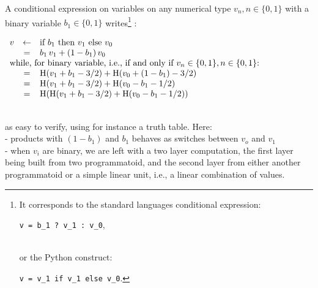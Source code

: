 \documentclass[a4]{article} \usepackage[left=2cm,right=3cm,top=1cm,bottom=2cm]{geometry}
\newcommand{\eqline}[1]{~\vspace{0.1cm}\\\centerline{$#1$}\vspace{0.1cm}\\}
\begin{document}
A conditional expression on variables on any numerical type $v_n, n \in \{0, 1\}$  with a binary variable $b_1 \in \{0, 1\}$ writes\footnote{It corresponds to the standard languages conditional expression: \\\centerline{{\tt v = b\_1 ? v\_1 : v\_0},}\\ or the Python construct: \\\centerline{{\tt v = v\_1 if v\_1 else v\_0}.}} : \eqline{\begin{array}{rcl}
     v &\leftarrow& \mbox{if } b_1 \mbox{ then } v_1 \mbox{ else } v_0 \\
    &=& b_1 \, v_1 + (1 - b_1) \, v_0 \\
    \multicolumn{3}{l}{\mbox{while, for binary variable, i.e., if and only if $v_n \in \{0, 1\},  n \in \{0, 1\}$: }} \\
    &=& \mbox{H}(v_1 + b_1 - 3/2) + \mbox{H}(v_0 + (1 - b_1) - 3/2) \\
    &=& \mbox{H}(v_1 + b_1 - 3/2) + \mbox{H}(v_0 - b_1 - 1/2) \\
    &=& \mbox{H}(\mbox{H}(v_1 + b_1 - 3/2) + \mbox{H}(v_0 - b_1 - 1/2)) \\
\end{array}}
as easy to verify, using for instance a truth table. Here:
\\- products with $(1 - b_1)$ and $b_1$ behaves as switches between $v_o$ and $v_1$
\\ - when $v_i$ are binary, we are left with a two layer computation, the first layer being built from two programmatoid,
and the second layer from either another programmatoid or a simple linear unit, i.e., a linear combination of values.
        
\end{document}
